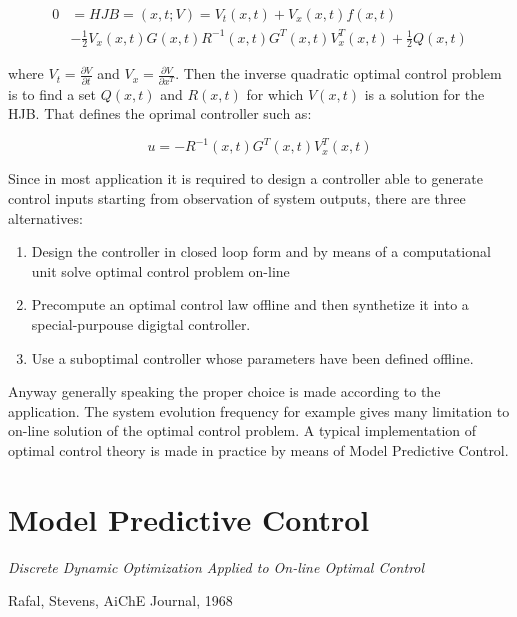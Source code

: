 \begin{equation}
	\begin{split}
		0&=HJB=(x,t;V)=V_t(x,t)+V_x(x,t)f(x,t) \\
		&-\frac{1}{2}		V_x(x,t)G(x,t)R^{-1 }		(x,t)G^T(x,t)V_x^T(x,t)+\frac{1}{2}Q(x,t)
\end{split}
\end{equation}

where $V_t=\frac{\partial V}{\partial t}$ and $V_x=\frac{\partial V}{\partial x^T}$. Then the inverse quadratic optimal control problem is to find a set $Q(x,t)$ and $R(x,t)$ for which $V(x,t)$ is a solution for the HJB. That defines the oprimal controller such as:

\begin{equation}
	u=-R^{-1}(x,t)G^T(x,t)V_x^T(x,t) 
\end{equation}

Since in most application it is required to design a controller able to generate control inputs starting from observation of system outputs, there are three alternatives: 

\begin{enumerate}
\item Design the controller in closed loop form and by means of a computational unit solve optimal control problem on-line
\item Precompute an optimal control law offline and then synthetize it into a special-purpouse digigtal controller.
\item Use a suboptimal controller whose parameters have been defined offline. 
\end{enumerate}

Anyway generally speaking the proper choice is made according to the application. The system evolution frequency for example gives many limitation to on-line solution of the optimal control problem. 
A typical implementation of optimal control theory is made in practice by means of Model Predictive Control. 

\section{Model Predictive Control}

\epigraph{\textit{Discrete Dynamic Optimization Applied to On-line Optimal Control}}{\begin{scriptsize}
Rafal, Stevens, AiChE Journal, 1968
\end{scriptsize}}

